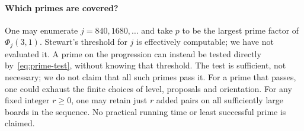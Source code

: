\paragraph{Which primes are covered?} One may enumerate $j=840,1680,\ldots$ and take $p$ to be the largest prime factor of $\Phi_j(3,1)$. Stewart's threshold for $j$ is effectively computable; we have not evaluated it. A prime on the progression can instead be tested directly by~\eqref{eq:prime-test}, without knowing that threshold. The test is sufficient, not necessary; we do not claim that all such primes pass it. For a prime that passes, one could exhaust the finite choices of level, proposals and orientation. For any fixed integer $r\ge0$, one may retain just $r$ added pairs on all sufficiently large boards in the sequence. No practical running time or least successful prime is claimed.
